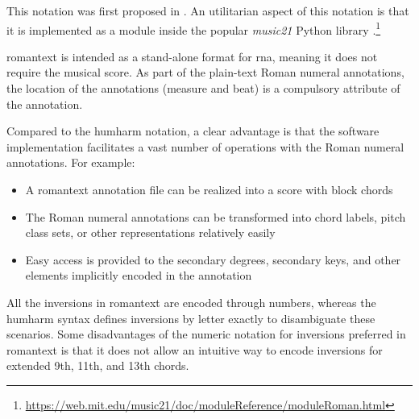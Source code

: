 

This notation was first proposed in
\textcite{gotham2019romantext}. An utilitarian aspect of
this notation is that it is implemented as a module inside
the popular \emph{music21} Python library
\parencite{cuthbert2010music21}.\footnote{\href{https://web.mit.edu/music21/doc/moduleReference/moduleRoman.html}{https://web.mit.edu/music21/doc/moduleReference/moduleRoman.html}}


\gls{romantext} is intended as a stand-alone format for
\gls{rna}, meaning it does not require the musical score. As
part of the plain-text Roman numeral annotations, the
location of the annotations (measure and beat) is a
compulsory attribute of the annotation.

Compared to the \gls{humharm} notation, a clear advantage is
that the software implementation facilitates a vast number
of operations with the Roman numeral annotations. For
example:

\begin{itemize}
    \item A \gls{romantext} annotation file can be realized
    into a score with block chords
    \item The Roman numeral annotations can be transformed
    into chord labels, pitch class sets, or other
    representations relatively easily
    \item Easy access is provided to the secondary degrees,
    secondary keys, and other elements implicitly encoded in
    the annotation
\end{itemize}

All the inversions in \gls{romantext} are encoded through
numbers, whereas the \gls{humharm} syntax defines inversions
by letter exactly to disambiguate these scenarios. Some
disadvantages of the numeric notation for inversions
preferred in \gls{romantext} is that it does not allow an
intuitive way to encode inversions for extended 9th, 11th,
and 13th chords. 
